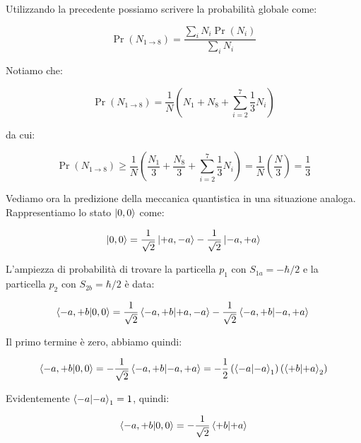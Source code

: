 Utilizzando la precedente possiamo scrivere la probabilit\`a globale come:

	\begin{equation}
		\Pr(N_{1 \rightarrow 8}) = \frac{\sum_i N_i \Pr(N_i)}{\sum_i N_i}
	\end{equation}

Notiamo che:

	\begin{equation}
		\Pr(N_{1 \rightarrow 8}) = \frac{1}{N} \left ( N_1 + N_8 + \sum_{i=2}^7 \frac{1}{3} N_i \right )
	\end{equation}

da cui:

	\begin{equation}
		\Pr(N_{1 \rightarrow 8}) \ge \frac{1}{N} \left ( \frac{N_1}{3} + \frac{N_8}{3} + \sum_{i=2}^7 \frac{1}{3} N_i \right )
		= \frac{1}{N} \left ( \frac{N}{3} \right ) = \frac{1}{3}
	\end{equation}

Vediamo ora la predizione della meccanica quantistica in una situazione analoga. Rappresentiamo lo stato $\ket{0, 0}$ come:

	\begin{equation}
		\ket{0, 0} = \frac{1}{\sqrt{2}} \ket{+a, -a} - \frac{1}{\sqrt{2}} \ket{-a, +a}
	\end{equation}

L'ampiezza di probabilit\`a di trovare la particella $p_1$ con $S_{1a} = - \hbar /2$ e la particella $p_2$ con $S_{2b} = \hbar / 2$ \`e data:

	\begin{equation}
		\braket{-a, +b}{0, 0}  =  \frac{1}{\sqrt{2}} \braket{-a, +b}{+a, -a} - \frac{1}{\sqrt{2}} \braket{-a, +b}{-a, +a} \\
	\end{equation}

Il primo termine \`e zero, abbiamo quindi:

	\begin{equation}
		\braket{-a, +b}{0, 0} = - \frac{1}{\sqrt{2}} \braket{-a, +b}{-a, +a} = - \frac{1}{2} \left ( \braket{-a}{-a}_1 \right )
			\left( \braket{+b}{+a}_2 \right )
	\end{equation}

Evidentemente $\braket{-a}{-a}_1 = 1$, quindi:

	\begin{equation}
		\braket{-a, +b}{0, 0} = - \frac{1}{\sqrt{2}} \braket{+b}{+a}
	\end{equation}


